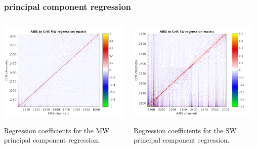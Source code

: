 \documentclass[10pt]{beamer}
\begin{document}
\begin{frame}
\frametitle{principal component regression}
\begin{columns}[t]
\begin{column}{0.5\textwidth}
  \begin{centering}
  \includegraphics[width=\textwidth]{slackfigs/MW_pc_regr_mat.png}
  \end{centering}\vspace{3mm}
  Regression coefficients for the MW principal component
  regression. 
 
\end{column}
\begin{column}{0.5\textwidth}  
  \begin{centering}
  \includegraphics[width=\textwidth]{slackfigs/SW_pc_regr_mat.png}
  \end{centering}\vspace{3mm}
  Regression coefficients for the SW principal component regression.

\end{column}
\end{columns}
\end{frame}
\end{document}
